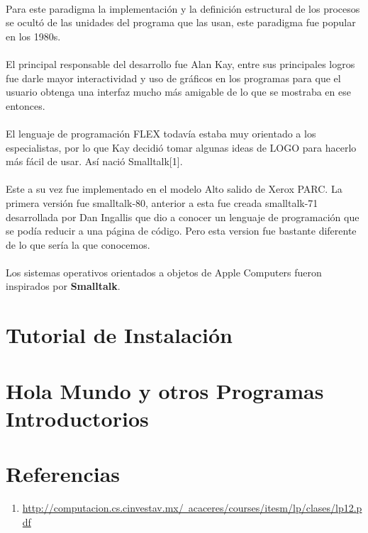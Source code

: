 \documentclass[11pt]{article}
\begin{document}
\paragraph{} \noindent
Para este paradigma la implementación y la definición estructural de los procesos se ocultó de las unidades del programa que las usan, este paradigma fue popular en los 1980s.
\paragraph{} \noindent
El principal responsable del desarrollo fue Alan Kay, entre sus principales logros fue darle mayor interactividad y uso de gráficos en los programas para que el usuario obtenga una interfaz mucho más amigable de lo que se mostraba en ese entonces.
\paragraph{} \noindent
El lenguaje de programación FLEX todavía estaba muy orientado a los especialistas, por lo que Kay decidió tomar algunas ideas de LOGO para hacerlo más fácil de usar. Así nació Smalltalk[1].
\paragraph{} \noindent
Este a su vez fue implementado en el modelo Alto salido de Xerox PARC. La primera versión fue smalltalk-80, anterior a esta fue creada smalltalk-71 desarrollada por Dan Ingallis que dio a conocer un lenguaje de programación que se podía reducir a una página de código. Pero esta version fue bastante diferente de lo que sería la que conocemos.
\paragraph{} \noindent
Los sistemas operativos orientados a objetos de Apple Computers fueron inspirados por \textbf{Smalltalk}.
\section{Tutorial de Instalación}
\section{Hola Mundo y otros Programas Introductorios}
\section{Referencias}
\begin{enumerate}
	\item \href{http://computacion.cs.cinvestav.mx/~acaceres/courses/itesm/lp/clases/lp12.pdf}{http://computacion.cs.cinvestav.mx/~acaceres/courses/itesm/lp/clases/lp12.pdf}
\end{enumerate}
\end{document}
